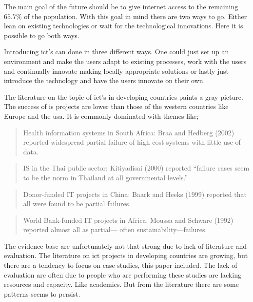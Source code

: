 The main goal of the future should be to give internet access to the remaining $65.7\%$ of the population.
With this goal in mind there are two ways to go. Either lean on existing technologies or wait for the technological innovations.
Here it is possible to go both ways. 

Introducing \gls{ict}'s can done in three different ways.
One could just set up an environment and make the users adapt to existing processes, work with the users and continually innovate making locally appropriate solutions or lastly just introduce the technology and have the users innovate on their own. 

\cite{internet:stats}
\cite{icd4d:rh}

The literature on the topic of \gls{ict}'s in developing countries paints a gray picture.
The success of \gls{is} projects are lower than those of the western countries like Europe and the \gls{usa}.
It is commonly dominated with themes like;
\begin{quotation}
Health information systems in South Africa: Braa
and Hedberg (2002) reported widespread partial
failure of high cost systems with little use of data.\cite{rh:isdc}
\end{quotation}

\begin{quotation}
IS in the Thai public sector: Kitiyadisai (2000)
reported “failure cases seem to be the norm in
Thailand at all governmental levels.”\cite{rh:isdc}
\end{quotation}

\begin{quotation}
Donor-funded IT projects in China: Baark and
Heeks (1999) reported that all were found to be
partial failures.\cite{rh:isdc}
\end{quotation}

\begin{quotation}
World Bank-funded IT projects in Africa: Moussa
and Schware (1992) reported almost all as partial—
often sustainability—failures.\cite{rh:isdc}
\end{quotation}

The evidence base are unfortunately not that strong due to lack of literature and evaluation.
The literature on \gls{ict} projects in developing countries are growing, but there are a tendency to focus on case studies, this paper included.
The lack of evaluation are often due to people who are performing these studies are lacking resources and capacity.
Like academics.
But from the literature there are some patterns seems to persist.

